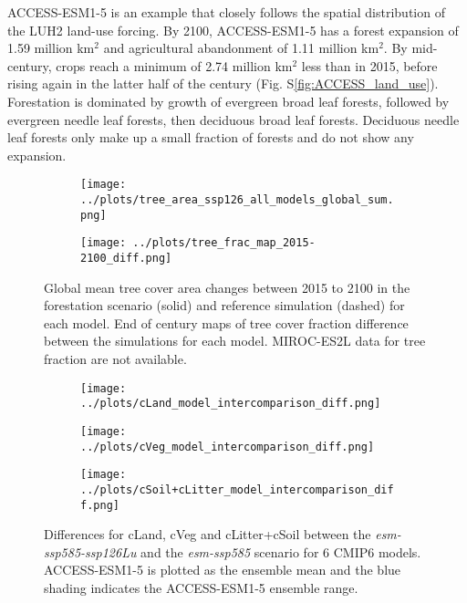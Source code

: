 \documentclass[]{article}
\begin{document}
ACCESS-ESM1-5 is an example that closely follows the spatial distribution of the LUH2 land-use forcing.
By 2100, ACCESS-ESM1-5 has a forest expansion of 1.59 million km$^2$ and agricultural abandonment of 1.11 million km$^2$.
By mid-century, crops reach a minimum of 2.74 million km$^2$ less than in 2015, before rising again in the latter half of the century (Fig. S\ref{fig:ACCESS_land_use}).
Forestation is dominated by growth of evergreen broad leaf forests, followed by evergreen needle leaf forests, then deciduous broad leaf forests.
Deciduous needle leaf forests only make up a small fraction of forests and do not show any expansion.

\begin{figure}[H]
    \centering
    \begin{subfigure}[b]{0.8\linewidth}
        \texttt{[image: ../plots/tree\_area\_ssp126\_all\_models\_global\_sum.png]}
    \end{subfigure}
    \begin{subfigure}[b]{0.8\linewidth}
        \texttt{[image: ../plots/tree\_frac\_map\_2015-2100\_diff.png]}
    \end{subfigure}
    \caption{Global mean tree cover area changes between 2015 to 2100 in the forestation scenario (solid) and reference simulation (dashed) for each model. End of century maps of tree cover fraction difference between the simulations for each model. MIROC-ES2L data for tree fraction are not available.}
    \label{fig:land_use_map}
\end{figure}

\begin{figure}[H]
    \centering
    \begin{subfigure}[b]{0.45\linewidth}
        \texttt{[image: ../plots/cLand\_model\_intercomparison\_diff.png]}
    \end{subfigure}
    \begin{subfigure}[b]{0.45\linewidth}
        \texttt{[image: ../plots/cVeg\_model\_intercomparison\_diff.png]}
    \end{subfigure}
    \begin{subfigure}[b]{0.45\linewidth}
        \texttt{[image: ../plots/cSoil+cLitter\_model\_intercomparison\_diff.png]}
    \end{subfigure}
    \caption{Differences for cLand, cVeg and cLitter+cSoil between the \textit{esm-ssp585-ssp126Lu} and the \textit{esm-ssp585} scenario for 6 CMIP6 models. ACCESS-ESM1-5 is plotted as the ensemble mean and the blue shading indicates the ACCESS-ESM1-5 ensemble range.}
    \label{fig:models_cpools}
\end{figure}
\end{document}
